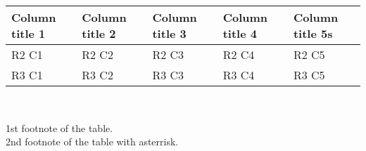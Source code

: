 \begin{table}[htbp]
\caption{}%
\label{} %
\begin{center} \begin{tabular}{lllll}%
\hline 
Column title 1&
Column title 2&
Column title 3&
Column title 4&
Column title 5s\tabularnewline
\hline
R2 C1&
R2 C2&
R2 C3&
R2 C4&
R2 C5\tabularnewline
R3 C1&
R3 C2&
R3 C3&
R3 C4&
R3 C5\tabularnewline
\hline
\end{tabular}\\
\parbox{0.7\columnwidth}{1st footnote of the table.\\%
\makebox[0cm][r]{$^{*}$}%
2nd footnote of the table with asterrisk.}
%
\end{center}
\end{table}

